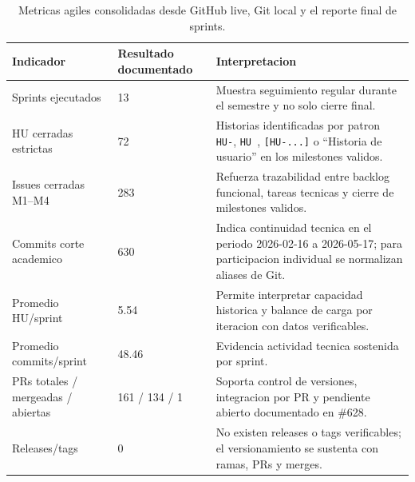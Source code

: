 \documentclass[11pt,a4paper]{article}
\begin{document}
\begin{table}[H]
\centering
\small
\begin{tabularx}{\linewidth}{P{3.4cm}P{3cm}Y}
\toprule
\textbf{Indicador} & \textbf{Resultado documentado} & \textbf{Interpretacion} \\
\midrule
Sprints ejecutados & 13 & Muestra seguimiento regular durante el semestre y no solo cierre final. \\
HU cerradas estrictas & 72 & Historias identificadas por patron \texttt{HU-}, \texttt{HU }, \texttt{[HU-...]} o ``Historia de usuario'' en los milestones validos. \\
Issues cerradas M1--M4 & 283 & Refuerza trazabilidad entre backlog funcional, tareas tecnicas y cierre de milestones validos. \\
Commits corte academico & 630 & Indica continuidad tecnica en el periodo 2026-02-16 a 2026-05-17; para participacion individual se normalizan aliases de Git. \\
Promedio HU/sprint & 5.54 & Permite interpretar capacidad historica y balance de carga por iteracion con datos verificables. \\
Promedio commits/sprint & 48.46 & Evidencia actividad tecnica sostenida por sprint. \\
PRs totales / mergeadas / abiertas & 161 / 134 / 1 & Soporta control de versiones, integracion por PR y pendiente abierto documentado en \#628. \\
Releases/tags & 0 & No existen releases o tags verificables; el versionamiento se sustenta con ramas, PRs y merges. \\
\bottomrule
\end{tabularx}
\caption{Metricas agiles consolidadas desde GitHub live, Git local y el reporte final de sprints.}
\end{table}
\end{document}
